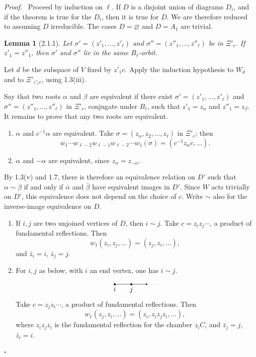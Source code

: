 \documentclass[11pt]{article}
\theoremstyle{plainen}
\newtheorem*{lemmax}{Lemma}
\newenvironment{proofx}{\par\emph{Proof.}\ }{\hfill$\square$\par}
\begin{document}
\begin{proofx}
Proceed by induction on $\ell$. If $D$ is a disjoint union of diagrams $D_i$, and if the theorem is true for the $D_i$, then it is true for $D$. We are therefore reduced to assuming $D$ irreducible. The cases $D=\varnothing$ and $D=A_1$ are trivial.

\begin{lemmax}[2.1.1]
Let $\sigma'=(z'_1,\ldots,z'_\ell)$ and $\sigma''=(z''_1,\ldots,z''_\ell)$ be in $\Xi'_c$. If $z'_1=z''_1$, then $\sigma'$ and $\sigma''$ lie in the same $B_\ell$-orbit.
\end{lemmax}

Let $d$ be the subspace of $V$ fixed by $z'_1c$. Apply the induction hypothesis to $W_d$ and to $\Xi'_{z'_1c}$, using 1.3(iii).

Say that two roots $\alpha$ and $\beta$ are equivalent if there exist $\sigma'=(z'_1,\ldots,z'_\ell)$ and $\sigma''=(z''_1,\ldots,z''_\ell)$ in $\Xi'_c$, conjugate under $B_\ell$, such that $z'_1=z_\alpha$ and $z''_1=z_\beta$. It remains to prove that any two roots are equivalent.

\begin{enumerate}[label=(\alph*),leftmargin=2.2em]
\item $\alpha$ and $c^{-1}\alpha$ are equivalent. Take $\sigma=(z_\alpha,z_2,\ldots,z_\ell)$ in $\Xi'_c$; then
\[
 w_1\cdots w_{\ell-2}w_{\ell-1}w_{\ell-2}\cdots w_1(\sigma)=(c^{-1}z_\alpha c,\ldots).
\]

\item $\alpha$ and $-\alpha$ are equivalent, since $z_\alpha=z_{-\alpha}$.
\end{enumerate}

By 1.3(v) and 1.7, there is therefore an equivalence relation on $D'$ such that $\alpha\sim\beta$ if and only if $\bar\alpha$ and $\bar\beta$ have equivalent images in $D'$. Since $W$ acts trivially on $D'$, this equivalence does not depend on the choice of $c$. Write $\sim$ also for the inverse-image equivalence on $D$.

\begin{enumerate}[label=(\alph*),leftmargin=2.2em,start=3]
\item If $i,j$ are two unjoined vertices of $D$, then $i\sim j$. Take $c=z_i z_j\cdots$, a product of fundamental reflections. Then
\[
 w_1(z_i,z_j,\ldots)=(z_j,z_i,\ldots),
\]
and $\bar z_i=i$, $\bar z_j=j$.

\item For $i,j$ as below, with $i$ an end vertex, one has $i\sim j$.
\[
\begin{tikzpicture}[baseline=-.5ex,scale=.7]
\draw (0,0)--(1.2,0)--(2.3,0);
\fill (0,0) circle (2pt) node[below]{$i$};
\fill (1.2,0) circle (2pt) node[below]{$j$};
\fill (2.3,0) circle (1.5pt);
\draw[dotted] (2.45,0)--(3.2,0);
\end{tikzpicture}
\]
Take $c=z_jz_i\cdots$, a product of fundamental reflections. Then
\[
 w_1(z_j,z_i,\ldots)=(z_i,z_i z_j z_i,\ldots),
\]
where $z_i z_j z_i$ is the fundamental reflection for the chamber $z_iC$, and $\bar z_j=j$, $\bar z_i=i$.
\end{enumerate}


\end{proofx}
\end{document}
